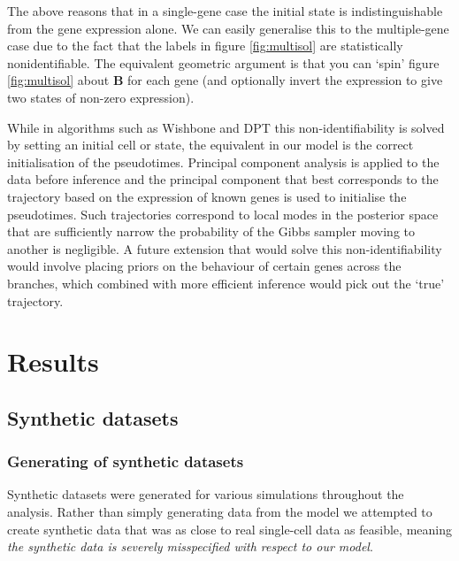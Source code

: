 The above reasons that in a single-gene case the initial state is indistinguishable from the gene expression alone. We can easily generalise this to the multiple-gene case due to the fact that the labels in figure \ref{fig:multisol} are statistically nonidentifiable. The equivalent geometric argument is that you can `spin' figure \ref{fig:multisol} about \textbf{B} for each gene (and optionally invert the expression to give two states of non-zero expression).

While in algorithms such as Wishbone and DPT this non-identifiability is solved by setting an initial cell or state, the equivalent in our model is the correct initialisation of the pseudotimes. Principal component analysis is applied to the data before inference and the principal component that best corresponds to the trajectory based on the expression of known genes is used to initialise the pseudotimes. Such trajectories correspond to local modes in the posterior space that are sufficiently narrow the probability of the Gibbs sampler moving to another is negligible. A future extension that would solve this non-identifiability would involve placing priors on the behaviour of certain genes across the branches, which combined with more efficient inference would pick out the `true' trajectory.


\section{Results}


\subsection{Synthetic datasets}

\subsubsection{Generating of synthetic datasets}

Synthetic datasets were generated for various simulations throughout the analysis. Rather than simply generating data from the model we attempted to create synthetic data that was as close to real single-cell data as feasible, meaning \emph{the synthetic data is severely misspecified with respect to our model}. 




